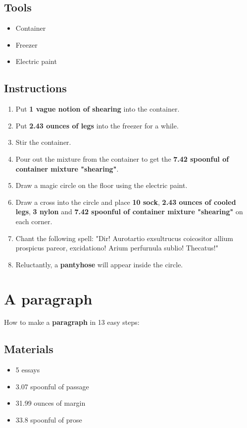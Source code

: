 \documentclass{article}
\begin{document}
\subsection{Tools}\begin{itemize}
\item 
Container
\item 
Freezer
\item 
Electric paint
\end{itemize}
\subsection{Instructions}\begin{enumerate}
\item 
Put \textbf{1 vague notion of shearing} into the container.
\item 
Put \textbf{2.43 ounces of legs} into the freezer for a while.
\item 
Stir the container.
\item 
Pour out the mixture from the container to get the \textbf{7.42 spoonful of container mixture "shearing"}.
\item 
Draw a magic circle on the floor using the electric paint.
\item 
Draw a cross into the circle and place \textbf{10 sock}, \textbf{2.43 ounces of cooled legs}, \textbf{3 nylon} and \textbf{7.42 spoonful of container mixture "shearing"} on each corner.
\item 
Chant the following spell: "Dir! Aurotartio exsultrucus coicositor allium prospicus pareor, excidationo! Arium perfurnula sublio! Thecatus!"
\item 
Reluctantly, a \textbf{pantyhose} will appear inside the circle.
\end{enumerate}
\newpage
\section{A paragraph}How to make a \textbf{paragraph} in 13 easy steps:

\subsection{Materials}\begin{itemize}
\item 
5 essays
\item 
3.07 spoonful of passage
\item 
31.99 ounces of margin
\item 
33.8 spoonful of prose
\end{itemize}
\end{document}
